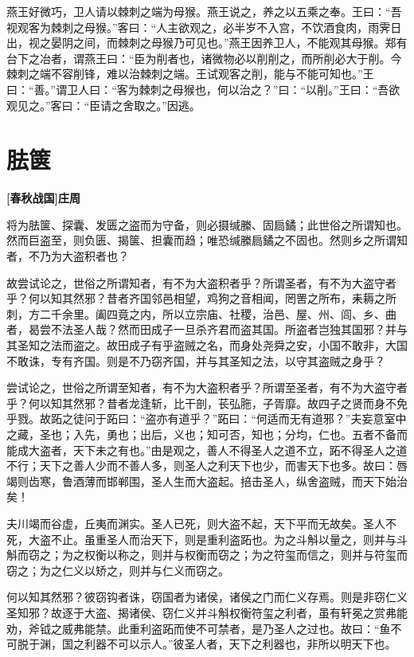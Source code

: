 \documentclass[UTF8,titlepage,oneside]{ctexbook}
\begin{document}
燕王好微巧，卫人请以棘刺之端为母猴。燕王说之，养之以五乘之奉。王曰：“吾视观客为棘刺之母猴。”客曰：“人主欲观之，必半岁不入宫，不饮酒食肉，雨霁日出，视之晏阴之间，而棘刺之母猴乃可见也。”燕王因养卫人，不能观其母猴。郑有台下之冶者，谓燕王曰：“臣为削者也，诸微物必以削削之，而所削必大于削。今棘刺之端不容削锋，难以治棘刺之端。王试观客之削，能与不能可知也。”王曰：“善。”谓卫人曰：“客为棘刺之母猴也，何以治之？”曰：“以削。”王曰：“吾欲观见之。”客曰：“臣请之舍取之。”因逃。


\chapter*{胠箧}
\begin{center}
	\textbf{[春秋战国]庄周}
\end{center}

将为胠箧、探囊、发匮之盗而为守备，则必摄缄縢、固扃鐍；此世俗之所谓知也。然而巨盗至，则负匮、揭箧、担囊而趋；唯恐缄縢扃鐍之不固也。然则乡之所谓知者，不乃为大盗积者也？

故尝试论之，世俗之所谓知者，有不为大盗积者乎？所谓圣者，有不为大盗守者乎？何以知其然邪？昔者齐国邻邑相望，鸡狗之音相闻，罔罟之所布，耒耨之所刺，方二千余里。阖四竟之内，所以立宗庙、社稷，治邑、屋、州、闾、乡、曲者，曷尝不法圣人哉？然而田成子一旦杀齐君而盗其国。所盗者岂独其国邪？并与其圣知之法而盗之。故田成子有乎盗贼之名，而身处尧舜之安，小国不敢非，大国不敢诛，专有齐国。则是不乃窃齐国，并与其圣知之法，以守其盗贼之身乎？

尝试论之，世俗之所谓至知者，有不为大盗积者乎？所谓至圣者，有不为大盗守者乎？何以知其然邪？昔者龙逢斩，比干剖，苌弘胣，子胥靡。故四子之贤而身不免乎戮。故跖之徒问于跖曰：“盗亦有道乎？”跖曰：“何适而无有道邪？”夫妄意室中之藏，圣也；入先，勇也；出后，义也；知可否，知也；分均，仁也。五者不备而能成大盗者，天下未之有也。”由是观之，善人不得圣人之道不立，跖不得圣人之道不行；天下之善人少而不善人多，则圣人之利天下也少，而害天下也多。故曰：唇竭则齿寒，鲁酒薄而邯郸围，圣人生而大盗起。掊击圣人，纵舍盗贼，而天下始治矣！

夫川竭而谷虚，丘夷而渊实。圣人已死，则大盗不起，天下平而无故矣。圣人不死，大盗不止。虽重圣人而治天下，则是重利盗跖也。为之斗斛以量之，则并与斗斛而窃之；为之权衡以称之，则并与权衡而窃之；为之符玺而信之，则并与符玺而窃之；为之仁义以矫之，则并与仁义而窃之。

何以知其然邪？彼窃钩者诛，窃国者为诸侯，诸侯之门而仁义存焉。则是非窃仁义圣知邪？故逐于大盗、揭诸侯、窃仁义并斗斛权衡符玺之利者，虽有轩冕之赏弗能劝，斧钺之威弗能禁。此重利盗跖而使不可禁者，是乃圣人之过也。故曰：“鱼不可脱于渊，国之利器不可以示人。”彼圣人者，天下之利器也，非所以明天下也。
\end{document}
